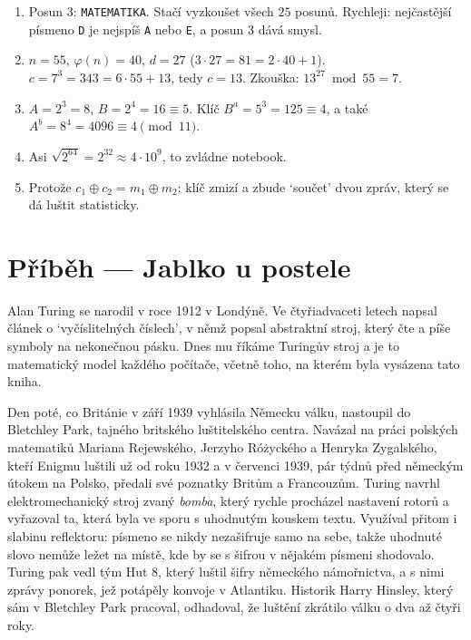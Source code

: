 \begin{solution}
  \begin{enumerate}[label=(\alph*)]
    \item Posun $3$: \texttt{MATEMATIKA}. Stačí vyzkoušet všech $25$ posunů. Rychleji: nejčastější písmeno \texttt{D} je nejspíš \texttt{A} nebo \texttt{E}, a posun $3$ dává smysl.
    \item $n = 55$, $\varphi(n) = 40$, $d = 27$ ($3\cdot 27 = 81 = 2\cdot 40 + 1$). $c = 7^3 = 343 = 6\cdot 55 + 13$, tedy $c = 13$. Zkouška: $13^{27}\bmod 55 = 7$.
    \item $A = 2^3 = 8$, $B = 2^4 = 16\equiv 5$. Klíč $B^a = 5^3 = 125\equiv 4$, a také $A^b = 8^4 = 4096\equiv 4\pmod{11}$.
    \item Asi $\sqrt{2^{64}} = 2^{32}\approx 4\cdot 10^9$, to zvládne notebook.
    \item Protože $c_1\oplus c_2 = m_1\oplus m_2$: klíč zmizí a zbude `součet' dvou zpráv, který se dá luštit statisticky.
  \end{enumerate}
\end{solution}

\section{Příběh --- Jablko u postele}

Alan Turing se narodil v roce 1912 v Londýně. Ve čtyřiadvaceti letech napsal článek o `vyčíslitelných číslech', v němž popsal abstraktní stroj, který čte a píše symboly na nekonečnou pásku. Dnes mu říkáme Turingův stroj a je to matematický model každého počítače, včetně toho, na kterém byla vysázena tato kniha.

Den poté, co Británie v září 1939 vyhlásila Německu válku, nastoupil do Bletchley Park, tajného britského luštitelského centra. Navázal na práci polských matematiků Mariana Rejewského, Jerzyho Różyckého a Henryka Zygalského, kteří Enigmu luštili už od roku 1932 a v červenci 1939, pár týdnů před německým útokem na Polsko, předali své poznatky Britům a Francouzům. Turing navrhl elektromechanický stroj zvaný \textit{bomba}, který rychle procházel nastavení rotorů a vyřazoval ta, která byla ve sporu s uhodnutým kouskem textu. Využíval přitom i slabinu reflektoru: písmeno se nikdy nezašifruje samo na sebe, takže uhodnuté slovo nemůže ležet na místě, kde by se s šifrou v nějakém písmeni shodovalo. Turing pak vedl tým Hut 8, který luštil šifry německého námořnictva, a s nimi zprávy ponorek, jež potápěly konvoje v Atlantiku. Historik Harry Hinsley, který sám v Bletchley Park pracoval, odhadoval, že luštění zkrátilo válku o dva až čtyři roky.

